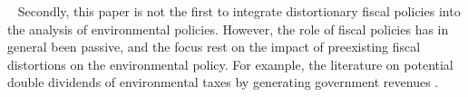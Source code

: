 \
Secondly, this paper is not the first to integrate distortionary fiscal policies into the analysis of environmental policies. However, the role of fiscal policies has in general been passive, and the focus rest on the impact of preexisting fiscal distortions on the environmental policy. For example, the literature on potential double dividends of environmental taxes by generating government revenues \citep[for instance,][]{Goulder1995EnvironmentalGuide, Bovenberg2002EnvironmentalRegulation}. 
